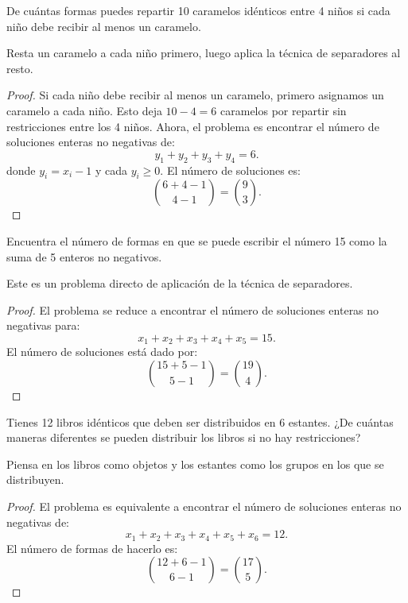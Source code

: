 \documentclass[11pt]{scrartcl}
\begin{document}
\begin{problem}
De cuántas formas puedes repartir 10 caramelos idénticos entre 4 niños si cada niño debe recibir al menos un caramelo.
\begin{hint}
Resta un caramelo a cada niño primero, luego aplica la técnica de separadores al resto.
\begin{proof}
Si cada niño debe recibir al menos un caramelo, primero asignamos un caramelo a cada niño. Esto deja \(10 - 4 = 6\) caramelos por repartir sin restricciones entre los 4 niños. Ahora, el problema es encontrar el número de soluciones enteras no negativas de:
\[ y_1 + y_2 + y_3 + y_4 = 6. \]
donde \(y_i = x_i - 1\) y cada \(y_i \geq 0\). El número de soluciones es:
\[ \binom{6+4-1}{4-1} = \binom{9}{3}. \]
\end{proof}
\end{hint}
\end{problem}

\begin{problem}
Encuentra el número de formas en que se puede escribir el número 15 como la suma de 5 enteros no negativos.
\begin{hint}
Este es un problema directo de aplicación de la técnica de separadores.
\begin{proof}
El problema se reduce a encontrar el número de soluciones enteras no negativas para:
\[ x_1 + x_2 + x_3 + x_4 + x_5 = 15. \]
El número de soluciones está dado por:
\[ \binom{15+5-1}{5-1} = \binom{19}{4}. \]
\end{proof}
\end{hint}
\end{problem}

\begin{problem}
Tienes 12 libros idénticos que deben ser distribuidos en 6 estantes. ¿De cuántas maneras diferentes se pueden distribuir los libros si no hay restricciones?
\begin{hint}
Piensa en los libros como objetos y los estantes como los grupos en los que se distribuyen.
\begin{proof}
El problema es equivalente a encontrar el número de soluciones enteras no negativas de:
\[ x_1 + x_2 + x_3 + x_4 + x_5 + x_6 = 12. \]
El número de formas de hacerlo es:
\[ \binom{12+6-1}{6-1} = \binom{17}{5}. \]
\end{proof}
\end{hint}
\end{problem}
\end{document}
